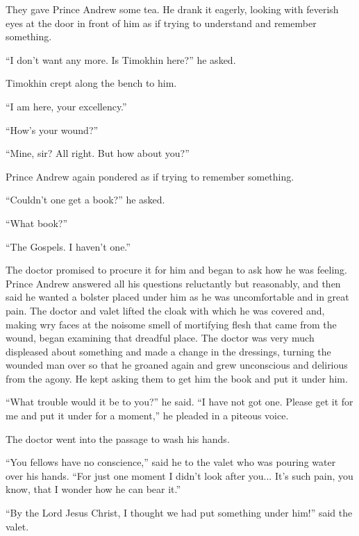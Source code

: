 They gave Prince Andrew some tea. He drank it eagerly, looking
with feverish eyes at the door in front of him as if trying to
understand and remember something.

``I don't want any more. Is Timokhin here?'' he asked.

Timokhin crept along the bench to him.

``I am here, your excellency.''

``How's your wound?''

``Mine, sir? All right. But how about you?''

Prince Andrew again pondered as if trying to remember something.

``Couldn't one get a book?'' he asked.

``What book?''

``The Gospels. I haven't one.''

The doctor promised to procure it for him and began to ask how he
was feeling. Prince Andrew answered all his questions reluctantly
but reasonably, and then said he wanted a bolster placed under
him as he was uncomfortable and in great pain. The doctor and
valet lifted the cloak with which he was covered and, making wry
faces at the noisome smell of mortifying flesh that came from the
wound, began examining that dreadful place. The doctor was very
much displeased about something and made a change in the
dressings, turning the wounded man over so that he groaned again
and grew unconscious and delirious from the agony. He kept asking
them to get him the book and put it under him.

``What trouble would it be to you?'' he said. ``I have not got
one. Please get it for me and put it under for a moment,'' he
pleaded in a piteous voice.

The doctor went into the passage to wash his hands.

``You fellows have no conscience,'' said he to the valet who was
pouring water over his hands. ``For just one moment I didn't look
after you...  It's such pain, you know, that I wonder how he can
bear it.''

``By the Lord Jesus Christ, I thought we had put something under
him!''  said the valet.

